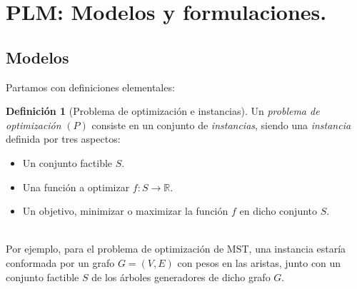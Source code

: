 \documentclass[10pt]{article}
\newcommand{\R}{\mathbb R}
\theoremstyle{plain}
\theoremstyle{definition}
\newtheorem{defi}{Definición}
\begin{document}
%
%
%
%
\section{PLM: Modelos y formulaciones.}
\subsection*{Modelos}
Partamos con definiciones elementales:\\
\begin{defi}[Problema de optimización e instancias]
Un \textit{problema de optimización} $(P)$ consiste en un conjunto de \textit{instancias}, siendo una \textit{instancia} definida por tres aspectos:
\begin{itemize}
\item Un conjunto factible $S$.
\item Una función a optimizar $f: S \to \R$.
\item Un objetivo, minimizar o maximizar la función $f$ en dicho conjunto $S$.
\end{itemize}
\end{defi}
~\\
Por ejemplo, para  el problema de optimización de MST, una instancia estaría conformada por un grafo $G = (V,E)$ con pesos en las aristas, junto con un conjunto factible  $S$ de los árboles generadores de dicho grafo $G$.\\
\end{document}
